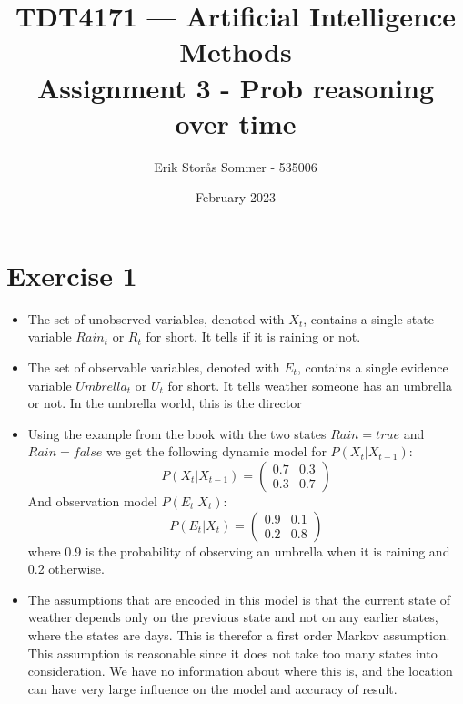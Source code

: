 \documentclass{article}
\title{TDT4171 — Artificial Intelligence Methods \\ Assignment 3 - Prob reasoning over time}
\author{Erik Storås Sommer - 535006}
\date{February 2023}
\begin{document}
\maketitle

\section*{Exercise 1}

\begin{itemize}
  \item The set of unobserved variables, denoted with \(X_t\), contains a single state variable \(Rain_t\) or \(R_t\) for short. It tells if it is raining or not.
  \item The set of observable variables, denoted with \(E_t\), contains a single evidence variable \(Umbrella_t\) or \(U_t\) for short. It tells weather someone has an umbrella or not. In the umbrella world, this is the director
  \item Using the example from the book with the two states \(Rain=true\) and \(Rain=false\) we get the following dynamic model for \(P(X_t|X_{t-1})\):
  \[P(X_t|X_{t-1})= \begin{pmatrix} 0.7 & 0.3 \\ 0.3 & 0.7 \end{pmatrix}\]
  And observation model \(P(E_t|X_t)\):
  \[P(E_t|X_t)= \begin{pmatrix} 0.9 & 0.1 \\ 0.2 & 0.8 \end{pmatrix}\]
  where 0.9 is the probability of observing an umbrella when it is raining and 0.2 otherwise.
  \item The assumptions that are encoded in this model is that the current state of weather depends only on the previous state and not on any earlier states, where the states are days. This is therefor a first order Markov assumption. This assumption is reasonable since it does not take too many states into consideration. We have no information about where this is, and the location can have very large influence on the model and accuracy of result.
\end{itemize}
\end{document}
